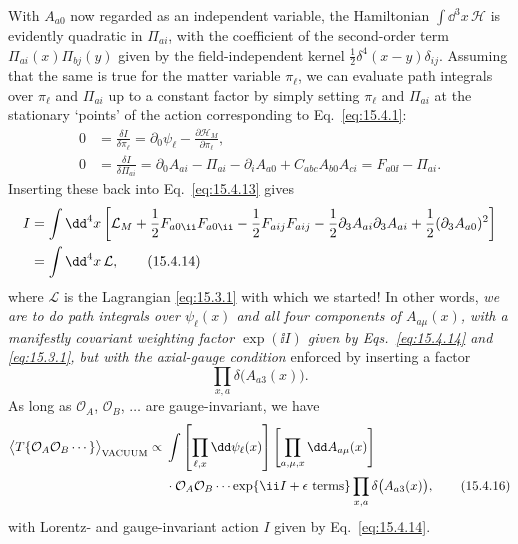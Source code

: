 With $A_{a0}$ now regarded as an independent variable, the Hamiltonian
$\int \dd^3x\,\mathcal H$ is evidently quadratic in $\Pi_{a i}$, with the
coefficient of the second-order term $\Pi_{a i}(x)\Pi_{b j}(y)$ given
by the field-independent kernel $\tfrac12\delta^4(x-y)\delta_{ij}$. Assuming
that the same is true for the matter variable $\pi_\ell$, we can evaluate path
integrals over $\pi_\ell$ and $\Pi_{a i}$ up to a constant factor by
simply setting $\pi_\ell$ and $\Pi_{a i}$ at the stationary `points' of
the action corresponding to Eq.~\eqref{eq:15.4.1}:
\begin{align*}
  0&=\frac{\delta I}{\delta\pi_\ell}
  =\partial_0\psi_\ell-\frac{\partial\mathcal H_M}{\partial\pi_\ell},\\
  0&=\frac{\delta I}{\delta\Pi_{a i}}
  =\partial_0A_{a i}-\Pi_{a i}-\partial_iA_{a0}
  +C_{abc}A_{b0}A_{c i}
  =F_{a0\ii}-\Pi_{a i}.
\end{align*}
Inserting these back into Eq.~\eqref{eq:15.4.13} gives
\begin{align}
  I&=\int \dd^4x\left[\mathcal L_M+\frac12F_{a0\ii}F_{a0\ii}
  -\frac12F_{a ij}F_{a ij}
  -\frac12\partial_3A_{a i}\partial_3A_{a i}
  +\frac12(\partial_3A_{a0})^2\right]
  \notag\\
  &=\int \dd^4x\,\mathcal L,
  \tag{15.4.14}\label{eq:15.4.14}
\end{align}
where $\mathcal L$ is the Lagrangian \eqref{eq:15.3.1} with which we started!
In other words, \emph{we are to do path integrals over $\psi_\ell(x)$ and all
four components of $A_{a\mu}(x)$, with a manifestly covariant weighting
factor $\exp(\ii I)$ given by Eqs.~\eqref{eq:15.4.14} and \eqref{eq:15.3.1}, but
with the axial-gauge condition} enforced by inserting a factor
\begin{equation}
  \prod_{x,a}\delta\bigl(A_{a3}(x)\bigr).
  \tag{15.4.15}\label{eq:15.4.15}
\end{equation}
As long as $\mathcal O_A$, $\mathcal O_B$, $\ldots$ are gauge-invariant, we have
\begin{align}
  \bigl\langle T\{\mathcal O_A\mathcal O_B\cdots\}\bigr\rangle_{\mathrm{VACUUM}}
  \propto{}&\int\left[\prod_{\ell,x}\dd\psi_\ell(x)\right]
  \left[\prod_{a,\mu,x}\dd A_{a\mu}(x)\right]
  \notag\\
  &\cdot\mathcal O_A\mathcal O_B\cdots
  \exp\{\ii I+\epsilon\text{ terms}\}
  \prod_{x,a}\delta\bigl(A_{a3}(x)\bigr),
  \tag{15.4.16}\label{eq:15.4.16}
\end{align}
with Lorentz- and gauge-invariant action $I$ given by Eq.~\eqref{eq:15.4.14}.

